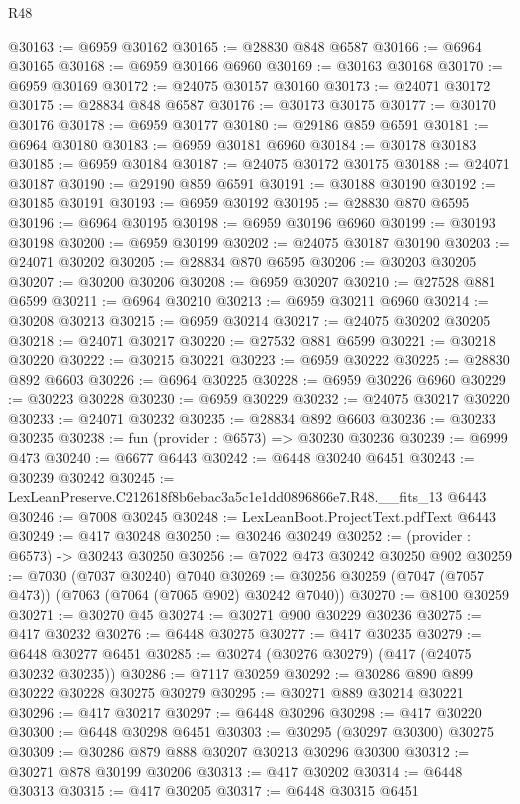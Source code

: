 \begin{lexlean}{R48}
\begin{coremodule}
@30163 := @6959 @30162
@30165 := @28830 @848 @6587
@30166 := @6964 @30165
@30168 := @6959 @30166 @6960
@30169 := @30163 @30168
@30170 := @6959 @30169
@30172 := @24075 @30157 @30160
@30173 := @24071 @30172
@30175 := @28834 @848 @6587
@30176 := @30173 @30175
@30177 := @30170 @30176
@30178 := @6959 @30177
@30180 := @29186 @859 @6591
@30181 := @6964 @30180
@30183 := @6959 @30181 @6960
@30184 := @30178 @30183
@30185 := @6959 @30184
@30187 := @24075 @30172 @30175
@30188 := @24071 @30187
@30190 := @29190 @859 @6591
@30191 := @30188 @30190
@30192 := @30185 @30191
@30193 := @6959 @30192
@30195 := @28830 @870 @6595
@30196 := @6964 @30195
@30198 := @6959 @30196 @6960
@30199 := @30193 @30198
@30200 := @6959 @30199
@30202 := @24075 @30187 @30190
@30203 := @24071 @30202
@30205 := @28834 @870 @6595
@30206 := @30203 @30205
@30207 := @30200 @30206
@30208 := @6959 @30207
@30210 := @27528 @881 @6599
@30211 := @6964 @30210
@30213 := @6959 @30211 @6960
@30214 := @30208 @30213
@30215 := @6959 @30214
@30217 := @24075 @30202 @30205
@30218 := @24071 @30217
@30220 := @27532 @881 @6599
@30221 := @30218 @30220
@30222 := @30215 @30221
@30223 := @6959 @30222
@30225 := @28830 @892 @6603
@30226 := @6964 @30225
@30228 := @6959 @30226 @6960
@30229 := @30223 @30228
@30230 := @6959 @30229
@30232 := @24075 @30217 @30220
@30233 := @24071 @30232
@30235 := @28834 @892 @6603
@30236 := @30233 @30235
@30238 := fun (provider : @6573) => @30230 @30236
@30239 := @6999 @473
@30240 := @6677 @6443
@30242 := @6448 @30240 @6451
@30243 := @30239 @30242
@30245 := LexLeanPreserve.C212618f8b6ebac3a5c1e1dd0896866e7.R48.__fits_13 @6443
@30246 := @7008 @30245
@30248 := LexLeanBoot.ProjectText.pdfText @6443
@30249 := @417 @30248
@30250 := @30246 @30249
@30252 := (provider : @6573) -> @30243 @30250
@30256 := @7022 @473 @30242 @30250 @902
@30259 := @7030 (@7037 @30240) @7040
@30269 := @30256 @30259 (@7047 (@7057 @473)) (@7063 (@7064 (@7065 @902) @30242 @7040))
@30270 := @8100 @30259
@30271 := @30270 @45
@30274 := @30271 @900 @30229 @30236
@30275 := @417 @30232
@30276 := @6448 @30275
@30277 := @417 @30235
@30279 := @6448 @30277 @6451
@30285 := @30274 (@30276 @30279) (@417 (@24075 @30232 @30235))
@30286 := @7117 @30259
@30292 := @30286 @890 @899 @30222 @30228 @30275 @30279
@30295 := @30271 @889 @30214 @30221
@30296 := @417 @30217
@30297 := @6448 @30296
@30298 := @417 @30220
@30300 := @6448 @30298 @6451
@30303 := @30295 (@30297 @30300) @30275
@30309 := @30286 @879 @888 @30207 @30213 @30296 @30300
@30312 := @30271 @878 @30199 @30206
@30313 := @417 @30202
@30314 := @6448 @30313
@30315 := @417 @30205
@30317 := @6448 @30315 @6451

\end{coremodule}
\end{lexlean}
